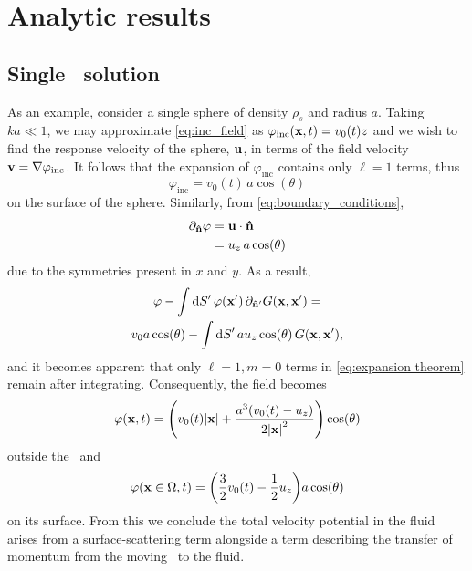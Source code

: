 \section{Analytic results}

\subsection{Single \bubble\ solution}

As an example, consider a single sphere of density $\rho_s$ and radius $a$.
Taking $k a \ll 1$, we may approximate \cref{eq:inc_field} as $\varphi_\text{inc}(\vb{x}, t) = v_0(t) z$ and we wish to find the response velocity of the sphere, $\vb{u}$, in terms of the field velocity $\vb{v} = \nabla \varphi_\text{inc}$. It follows that the expansion of $\varphi_\text{inc}$ contains only $\ell = 1$ terms, thus
\begin{equation}
  \label{eq:uniform field}
  \varphi_\text{inc} = v_0(t) \, a \cos(\theta)
\end{equation}
on the surface of the sphere. Similarly, from \cref{eq:boundary_conditions},
\begin{align}
  \partial_{\vu{n}} \varphi &= \vb{u} \cdot \vu{n} \nonumber \\
                            &= u_z \, a \cos(\theta)
\end{align}
due to the symmetries present in $x$ and $y$.
As a result,
\begin{equation}
  \begin{gathered}
    \varphi - \int \dd{S'} \varphi(\vb{x}') \, \partial_{\vu{n}'} G(\vb{x}, \vb{x}') = \\
    v_0 a \cos(\theta) - \int \dd{S}' a u_z \cos(\theta) \, G(\vb{x}, \vb{x}'),
  \end{gathered}
\end{equation}
and it becomes apparent that only $\ell = 1, m = 0$ terms in \cref{eq:expansion theorem} remain after integrating.
Consequently, the field becomes
\begin{equation}
  \label{eq:dipole}
  \varphi(\vb{x}, t) = \qty(v_0(t) \abs{\vb{x}} + \frac{a^3\qty(v_0(t) - u_z)}{2\abs{\vb{x}}^2})\cos(\theta)
\end{equation}
outside the \bubble\ and
\begin{equation}
  \varphi(\vb{x} \in \Omega, t) = \qty(\frac{3}{2}v_0(t) - \frac{1}{2} u_z)a \cos(\theta)
\end{equation}
on its surface.
From this we conclude the total velocity potential in the fluid arises from a surface-scattering term alongside a term describing the transfer of momentum from the moving \bubble\ to the fluid.

